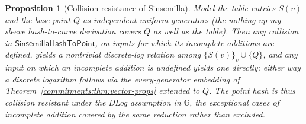 \documentclass[11pt,a4paper]{article}
\newtheorem{proposition}[theorem]{Proposition}
\theoremstyle{definition}
\theoremstyle{remark}
\newcommand{\G}{\ensuremath{\mathbb{G}}}
\begin{document}
\begin{proposition}[Collision resistance of Sinsemilla]
\label{commitments:prop:sinsemilla-cr}
Model the table entries \(S(v)\) and the base point \(Q\) as
independent uniform generators (the nothing-up-my-sleeve
hash-to-curve derivation covers \(Q\) as well as the table). Then
any collision in \(\mathsf{SinsemillaHashToPoint}\), on inputs for
which its incomplete additions are defined, yields a nontrivial
discrete-log relation among \(\{S(v)\}_v \cup \{Q\}\), and any input
on which an incomplete addition is \emph{undefined} yields one
directly; either way a discrete logarithm follows via the
every-generator embedding of
Theorem~\ref{commitments:thm:vector-props} extended to \(Q\). The
point hash is thus collision resistant under the DLog assumption in
\(\G\), the exceptional cases of incomplete addition covered by the
same reduction rather than excluded.
\end{proposition}
\end{document}
